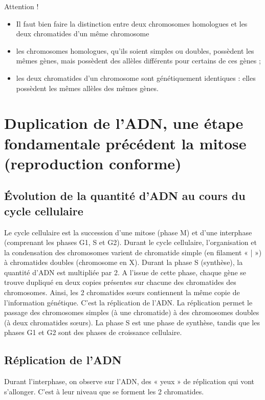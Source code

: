 Attention !\begin{itemize}
\item	Il faut bien faire la distinction entre deux chromosomes homologues et les deux chromatides d'un même chromosome 
\item	les chromosomes homologues, qu'ils soient simples ou doubles, possèdent les mêmes gènes, mais possèdent des allèles différents pour certains de ces gènes ;
\item	les deux chromatides d'un chromosome sont génétiquement identiques : elles possèdent les mêmes allèles des mêmes gènes.\end{itemize}
\section{Duplication de l'ADN, une étape fondamentale précédent la mitose (reproduction conforme)}
\subsection{Évolution de la quantité d'ADN au cours du cycle cellulaire}
Le cycle cellulaire est la succession d'une mitose (phase M) et d'une interphase (comprenant les phases G1, S et G2). Durant le cycle cellulaire, l'organisation et la condensation des chromosomes varient de chromatide simple (en filament « | ») à chromatides doubles (chromosome en X).
Durant la phase S (synthèse), la quantité d'ADN est multipliée par 2. A l’issue de cette phase, chaque gène se trouve dupliqué en deux copies présentes sur chacune des chromatides des chromosomes. Ainsi, les 2 chromatides sœurs contiennent la même copie de l'information génétique. C'est la réplication de l’ADN. 
La réplication permet le passage des chromosomes simples (à une chromatide) à des chromosomes doubles (à deux chromatides sœurs).
La phase S est une phase de synthèse, tandis que les phases G1 et G2 sont des phases de croissance cellulaire. 
\subsection{Réplication de l'ADN}
Durant l'interphase, on observe sur l'ADN, des « yeux » de réplication qui vont s'allonger. C'est à leur niveau que se forment les 2 chromatides.



